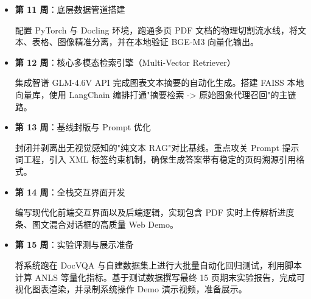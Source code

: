 ﻿\documentclass[UTF8, heading=true]{ctexart}
\begin{document}
\begin{itemize}
    \item \textbf{第 11 周}：底层数据管道搭建
    
    配置 PyTorch 与 Docling 环境，跑通多页 PDF 文档的物理切割流水线，将文本、表格、图像精准分离，并在本地验证 BGE-M3 向量化输出。
    
    \item \textbf{第 12 周}：核心多模态检索引擎（Multi-Vector Retriever）
    
    集成智谱 GLM-4.6V API 完成图表文本摘要的自动化生成。搭建 FAISS 本地向量库，使用 LangChain 编排打通"摘要检索 -> 原始图象代理召回"的主链路。
    
    \item \textbf{第 13 周}：基线封版与 Prompt 优化
    
    封闭并剥离出无视觉感知的"纯文本 RAG"对比基线。重点攻关 Prompt 提示词工程，引入 XML 标签约束机制，确保生成答案带有稳定的页码溯源引用格式。
    
    \item \textbf{第 14 周}：全栈交互界面开发
    
    编写现代化前端交互界面以及后端逻辑，实现包含 PDF 实时上传解析进度条、图文混合对话框的高质量 Web Demo。
    
    \item \textbf{第 15 周}：实验评测与展示准备
    
    将系统跑在 DocVQA 与自建数据集上进行大批量自动化回归测试，利用脚本计算 ANLS 等量化指标。基于测试数据撰写最终 15 页期末实验报告，完成可视化图表渲染，并录制系统操作 Demo 演示视频，准备展示。
\end{itemize}
\end{document}

